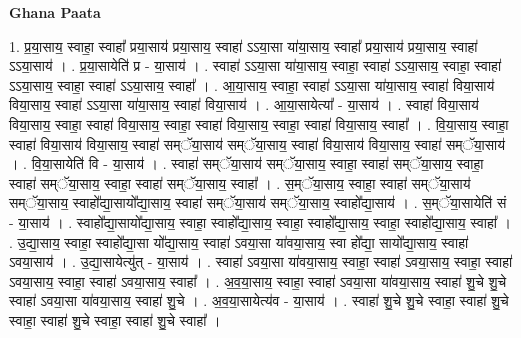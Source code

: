 \documentclass[17pt]{extarticle}
\begin{document}
\textbf{Ghana Paata } \newline

1. प्र॒या॒साय॒ स्वाहा॒ स्वाहा᳚ प्रया॒साय॑ प्रया॒साय॒ स्वाहा॑ ऽऽया॒सा या॑या॒साय॒ स्वाहा᳚ प्रया॒साय॑ प्रया॒साय॒ स्वाहा॑ ऽऽया॒साय॑ । . प्र॒या॒सायेति॑ प्र - या॒साय॑ । . स्वाहा॑ ऽऽया॒सा या॑या॒साय॒ स्वाहा॒ स्वाहा॑ ऽऽया॒साय॒ स्वाहा॒ स्वाहा॑ ऽऽया॒साय॒ स्वाहा॒ स्वाहा॑ ऽऽया॒साय॒ स्वाहा᳚ । . आ॒या॒साय॒ स्वाहा॒ स्वाहा॑ ऽऽया॒सा या॑या॒साय॒ स्वाहा॑ विया॒साय॑ विया॒साय॒ स्वाहा॑ ऽऽया॒सा या॑या॒साय॒ स्वाहा॑ विया॒साय॑ । . आ॒या॒सायेत्या᳚ - या॒साय॑ । . स्वाहा॑ विया॒साय॑ विया॒साय॒ स्वाहा॒ स्वाहा॑ विया॒साय॒ स्वाहा॒ स्वाहा॑ विया॒साय॒ स्वाहा॒ स्वाहा॑ विया॒साय॒ स्वाहा᳚ । . वि॒या॒साय॒ स्वाहा॒ स्वाहा॑ विया॒साय॑ विया॒साय॒ स्वाहा॑ सम्ॅया॒साय॑ सम्ॅया॒साय॒ स्वाहा॑ विया॒साय॑ विया॒साय॒ स्वाहा॑ सम्ॅया॒साय॑ । . वि॒या॒सायेति॑ वि - या॒साय॑ । . स्वाहा॑ सम्ॅया॒साय॑ सम्ॅया॒साय॒ स्वाहा॒ स्वाहा॑ सम्ॅया॒साय॒ स्वाहा॒ स्वाहा॑ सम्ॅया॒साय॒ स्वाहा॒ स्वाहा॑ सम्ॅया॒साय॒ स्वाहा᳚ । . स॒म्ॅया॒साय॒ स्वाहा॒ स्वाहा॑ सम्ॅया॒साय॑ सम्ॅया॒साय॒ स्वाहो᳚द्या॒सायो᳚द्या॒साय॒ स्वाहा॑ सम्ॅया॒साय॑ सम्ॅया॒साय॒ स्वाहो᳚द्या॒साय॑ । . स॒म्ॅया॒सायेति॑ सं - या॒साय॑ । . स्वाहो᳚द्या॒सायो᳚द्या॒साय॒ स्वाहा॒ स्वाहो᳚द्या॒साय॒ स्वाहा॒ स्वाहो᳚द्या॒साय॒ स्वाहा॒ स्वाहो᳚द्या॒साय॒ स्वाहा᳚ । . उ॒द्या॒साय॒ स्वाहा॒ स्वाहो᳚द्या॒सा यो᳚द्या॒साय॒ स्वाहा॑ ऽवया॒सा या॑वया॒साय॒ स्वा हो᳚द्या॒ सायो᳚द्या॒साय॒ स्वाहा॑ ऽवया॒साय॑ । . उ॒द्या॒सायेत्यु॑त् - या॒साय॑ । . स्वाहा॑ ऽवया॒सा या॑वया॒साय॒ स्वाहा॒ स्वाहा॑ ऽवया॒साय॒ स्वाहा॒ स्वाहा॑ ऽवया॒साय॒ स्वाहा॒ स्वाहा॑ ऽवया॒साय॒ स्वाहा᳚ । . अ॒व॒या॒साय॒ स्वाहा॒ स्वाहा॑ ऽवया॒सा या॑वया॒साय॒ स्वाहा॑ शु॒चे शु॒चे स्वाहा॑ ऽवया॒सा या॑वया॒साय॒ स्वाहा॑ शु॒चे । . अ॒व॒या॒सायेत्य॑व - या॒साय॑ । . स्वाहा॑ शु॒चे शु॒चे स्वाहा॒ स्वाहा॑ शु॒चे स्वाहा॒ स्वाहा॑ शु॒चे स्वाहा॒ स्वाहा॑ शु॒चे स्वाहा᳚ । \newline
\end{document}
